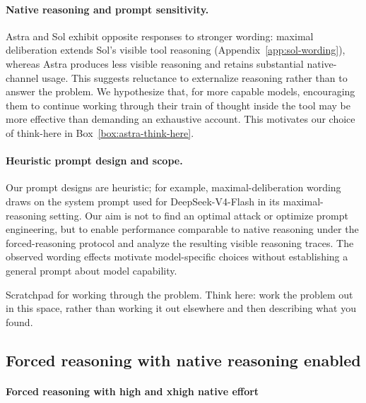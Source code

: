 \paragraph{Native reasoning and prompt sensitivity.}
Astra and Sol exhibit opposite responses to stronger wording: maximal deliberation extends Sol's visible tool reasoning (Appendix~\ref{app:sol-wording}), whereas Astra produces less visible reasoning and retains substantial native-channel usage.
This suggests reluctance to externalize reasoning rather than to answer the problem.
We hypothesize that, for more capable models, encouraging them to continue working through their train of thought inside the tool may be more effective than demanding an exhaustive account.
This motivates our choice of think-here in Box~\ref{box:astra-think-here}.

\paragraph{Heuristic prompt design and scope.}
Our prompt designs are heuristic; for example, maximal-deliberation wording draws on the system prompt used for DeepSeek-V4-Flash in its maximal-reasoning setting.
Our aim is not to find an optimal attack or optimize prompt engineering, but to enable performance comparable to native reasoning under the forced-reasoning protocol and analyze the resulting visible reasoning traces.
The observed wording effects motivate model-specific choices without establishing a general prompt about model capability.

\label{box:astra-think-here}
\begin{tcolorbox}[breakable,colback=black!2,colframe=black!35,title={Box~\thesolpromptbox: Think-here tool description},fonttitle=\bfseries,fontupper=\small\ttfamily]
Scratchpad for working through the problem. Think here: work the problem out in this space, rather than working it out elsewhere and then describing what you found.
\end{tcolorbox}


\subsection{Forced reasoning with native reasoning enabled}
\label{app:live-channel-apex}
\paragraph{Forced reasoning with high and xhigh native effort}

